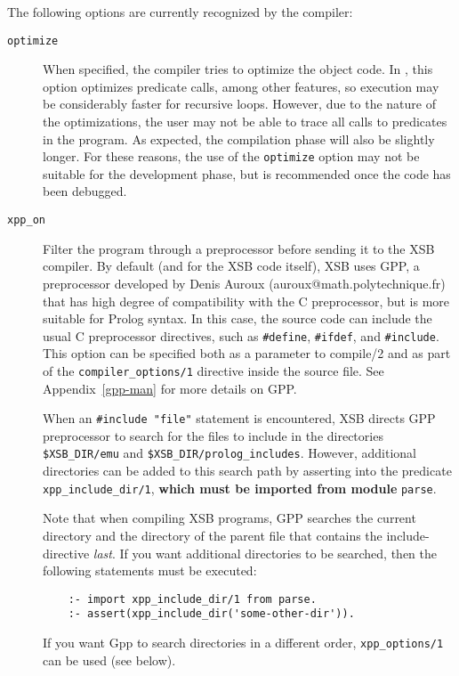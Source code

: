 The following options are currently recognized by the compiler:
\begin{description}
\item[{\tt optimize}]
	When specified, the compiler tries to optimize the object code.
	In \version, this option optimizes predicate calls, among other
	features, so execution may be considerably faster for recursive
	loops.  However,
	due to the nature of the optimizations, the user may not be able to
	trace all calls to predicates in the program.  
	As expected, the compilation phase will also be slightly
	longer.  For these reasons, the use of the {\tt optimize} option may
	not be suitable for the development phase, but is
	recommended once the code has been debugged.


\item[{\tt xpp\_on}]
  Filter the program through a preprocessor  before sending it to the XSB 
  compiler. By default (and for the XSB code itself), XSB uses GPP, a
  preprocessor developed by Denis Auroux (auroux@math.polytechnique.fr)
  that has high degree of compatibility with the C preprocessor, but is
  more suitable for Prolog syntax. In this case, the source code can
  include the usual C 
  preprocessor directives, such as \verb|#define|, \verb|#ifdef|, and
  \verb|#include|. This option can be specified both as a parameter to
  compile/2 and as part of the {\tt compiler\_options/1} directive inside
  the source file. See Appendix~\ref{gpp-man} for more details on GPP.

  When an \verb|#include "file"| statement is encountered,
  XSB directs GPP preprocessor to search for the files to include in the
  directories \verb|$XSB_DIR/emu| 
  and \verb|$XSB_DIR/prolog_includes|.
  However, additional directories can be added to this search path by
  asserting into the predicate \verb|xpp_include_dir/1|, {\bf which must
    be imported from module} {\tt parse}.
  
  Note that when compiling XSB programs, GPP searches the current directory
  and the directory of the parent file that contains the include-directive
  \emph{last}. If you want additional directories to be searched, then the
  following statements must be executed:
\begin{verbatim}
    :- import xpp_include_dir/1 from parse.
    :- assert(xpp_include_dir('some-other-dir')).
\end{verbatim}
  If you want Gpp to search directories in a different order,
  {\tt xpp\_options/1} can be used (see below).


\end{description}
